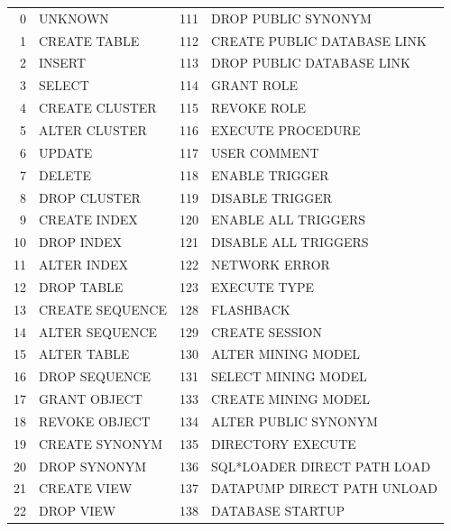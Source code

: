 \begin{appendix}
\begin{longtable}[]{@{}rl|rl@{}}
0    & UNKNOWN                      & 111 & DROP PUBLIC SYNONYM          \\
1    & CREATE TABLE                 & 112 & CREATE PUBLIC DATABASE LINK  \\
2    & INSERT                       & 113 & DROP PUBLIC DATABASE LINK    \\
3    & SELECT                       & 114 & GRANT ROLE                   \\
4    & CREATE CLUSTER               & 115 & REVOKE ROLE                  \\      
5    & ALTER CLUSTER                & 116 & EXECUTE PROCEDURE            \\
6    & UPDATE                       & 117 & USER COMMENT                 \\
7    & DELETE                       & 118 & ENABLE TRIGGER               \\
8    & DROP CLUSTER                 & 119 & DISABLE TRIGGER              \\
9    & CREATE INDEX                 & 120 & ENABLE ALL TRIGGERS          \\
10   & DROP INDEX                   & 121 & DISABLE ALL TRIGGERS         \\
11   & ALTER INDEX                  & 122 & NETWORK ERROR                \\
12   & DROP TABLE                   & 123 & EXECUTE TYPE                 \\
13   & CREATE SEQUENCE              & 128 & FLASHBACK                    \\
14   & ALTER SEQUENCE               & 129 & CREATE SESSION               \\
15   & ALTER TABLE                  & 130 & ALTER MINING MODEL           \\
16   & DROP SEQUENCE                & 131 & SELECT MINING MODEL          \\
17   & GRANT OBJECT                 & 133 & CREATE MINING MODEL          \\
18   & REVOKE OBJECT                & 134 & ALTER PUBLIC SYNONYM         \\
19   & CREATE SYNONYM               & 135 & DIRECTORY EXECUTE            \\
20   & DROP SYNONYM                 & 136 & SQL*LOADER DIRECT PATH LOAD  \\
21   & CREATE VIEW                  & 137 & DATAPUMP DIRECT PATH UNLOAD  \\
22   & DROP VIEW                    & 138 & DATABASE STARTUP             \\

\end{longtable}
\end{appendix}
